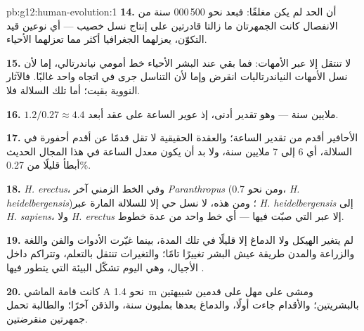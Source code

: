 \begin{solution}{pb:g12:human-evolution:1}
\textbf{14.} أن الحد لم يكن مغلقًا: فبعد نحو 500\,000 سنة من الانفصال
كانت الجمهرتان ما زالتا قادرتين على إنتاج نسل خصيب --- أي نوعين قيد
التكوّن، يعزلهما الجغرافيا أكثر مما تعزلهما الأحياء.

\textbf{15.}  لا تنتقل إلا عبر الأمهات: فما بقي عند البشر
الأحياء خط أمومي نياندرتالي، إما لأن نسل الأمهات النياندرتاليات انقرض
وإما لأن التناسل جرى في اتجاه واحد غالبًا. فالآثار النووية بقيت؛ أما
تلك السلالة فلا.

\textbf{16.} $1.2/0.27 \approx 4.4$ ملايين سنة --- وهو تقدير أدنى، إذ
عوير الساعة على عقد أبعد.

\textbf{17.} الأحافير أقدم من تقدير الساعة؛ والعقدة الحقيقية لا تقل
قدمًا عن أقدم أحفورة في السلالة، أي 6 إلى 7 ملايين سنة، ولا بد أن يكون
معدل الساعة في هذا المجال الحديث أبطأ قليلًا من 0.27\%.

\textbf{18.} \emph{H. erectus}، وفي الخط الزمني آخر
\emph{Paranthropus} (ومن نحو 0.7، \emph{H. heidelbergensis})؛ ومن
هذه، لا نسل حي إلا للسلالة المارة عبر \emph{H. heidelbergensis} إلى
\emph{H. sapiens}، ولا  \emph{H. erectus} إلا عبر  التي صبّت
فيها --- أي خط واحد من عدة خطوط.

\textbf{19.} لم يتغير الهيكل ولا الدماغ إلا قليلًا في تلك المدة، بينما
غيّرت الأدوات والفن واللغة والزراعة والمدن طريقة عيش البشر تغييرًا
تامًا؛ والتغيرات تنتقل بالتعلم، وتتراكم داخل الأجيال، وهي اليوم تشكّل
البيئة التي يتطور فيها .

\textbf{20.} كانت قامة الماشي A نحو \qty{1.4}{m} ومشى على مهل على
قدمين شبيهتين بالبشريتين؛ والأقدام جاءت أولًا، والدماغ بعدها بمليون
سنة، والذقن آخرًا؛ والطالبة تحمل  جمهرتين منقرضتين.
\end{solution}
